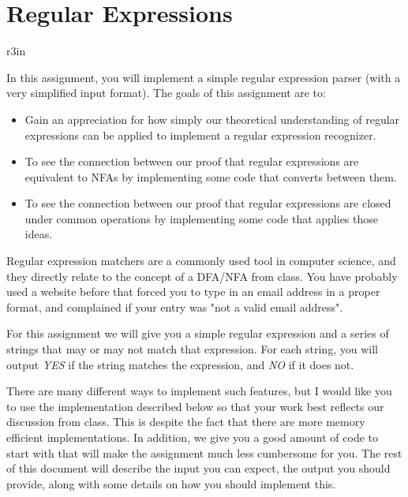 \documentclass[11pt]{article}
\begin{document}
\section*{Regular Expressions}


\begin{wrapfigure}{r}{3in}
\vspace{-10pt}
\vspace{-30pt}
\end{wrapfigure}

In this assignment, you will implement a simple regular expression parser (with a very simplified input format). The goals of this assignment are to:

\begin{itemize}
	\item Gain an appreciation for how simply our theoretical understanding of regular expressions can be applied to implement a regular expression recognizer.
	\item To see the connection between our proof that regular expressions are equivalent to NFAs by implementing some code that converts between them.
	\item To see the connection between our proof that regular expressions are closed under common operations by implementing some code that applies those ideas.
\end{itemize}

Regular expression matchers are a commonly used tool in computer science, and they directly relate to the concept of a DFA/NFA from class. You have probably used a website before that forced you to type in an email address in a proper format, and complained if your entry was "not a valid email address".

For this assignment we will give you a simple regular expression and a series of strings that may or may not match that expression. For each string, you will output \emph{YES} if the string matches the expression, and \emph{NO} if it does not.

There are many different ways to implement such features, but I would like you to use the implementation described below so that your work best reflects our discussion from class. This is despite the fact that there are more memory efficient implementations. In addition, we give you a good amount of code to start with that will make the assignment much less cumbersome for you. The rest of this document will describe the input you can expect, the output you should provide, along with some details on how you should implement this.
\end{document}
